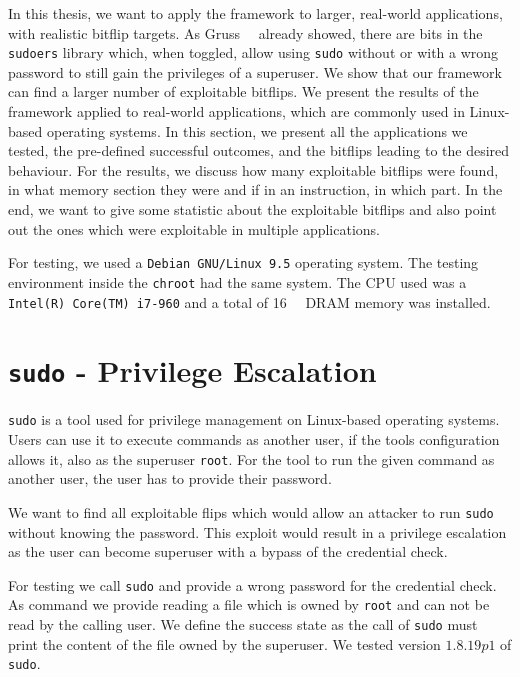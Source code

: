 In this thesis, we want to apply the framework to larger, real-world
applications, with realistic bitflip targets. As
Gruss~\etal~\cite{flipinthewall} already showed, there are bits in the
\texttt{sudoers} library which, when toggled, allow using \texttt{sudo} without
or with a wrong password to still gain the privileges of a superuser. We show
that our framework can find a larger number of exploitable bitflips. We present
the results of the framework applied to real-world applications, which are
commonly used in Linux-based operating systems. In this section, we present all
the applications we tested, the pre-defined successful outcomes, and the
bitflips leading to the desired behaviour. For the results, we discuss how many
exploitable bitflips were found, in what memory section they were and if in an
instruction, in which part. In the end, we want to give some statistic about the
exploitable bitflips and also point out the ones which were exploitable in
multiple applications.

For testing, we used a \texttt{Debian GNU/Linux 9.5} operating system. The
testing environment inside the \texttt{chroot} had the same system. The CPU used
was a \mbox{\texttt{Intel(R) Core(TM) i7-960}} and a total of
\SI{16}{\giga\byte} DRAM memory was installed.

\section{\texttt{sudo} - Privilege Escalation}

\texttt{sudo} is a tool used for privilege management on Linux-based operating
systems. Users can use it to execute commands as another user, if the
tool\textquotesingle s configuration allows it, also as the superuser
\texttt{root}. For the tool to run the given command as another user, the user
has to provide their password.

We want to find all exploitable flips which would allow an attacker to run
\texttt{sudo} without knowing the password. This exploit would result in a
privilege escalation as the user can become superuser with a bypass of the
credential check.

For testing we call \texttt{sudo} and provide a wrong password for the
credential check. As command we provide reading a file which is owned by
\texttt{root} and can not be read by the calling user. We define the success
state as the call of \texttt{sudo} must print the content of the file owned by
the superuser. We tested version $1.8.19p1$ of \texttt{sudo}.

